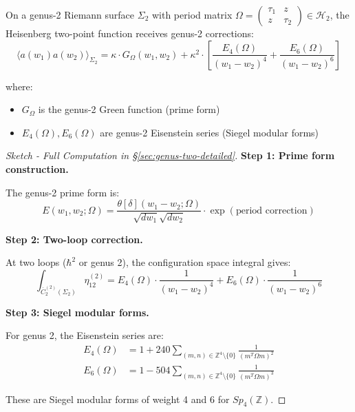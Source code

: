 \begin{theorem}\label{thm:heisenberg-genus-two}
On a genus-2 Riemann surface $\Sigma_2$ with period matrix 
$\Omega = \begin{pmatrix} \tau_1 & z \\ z & \tau_2 \end{pmatrix} \in \mathcal{H}_2$, 
the Heisenberg two-point function receives genus-2 corrections:
\begin{equation}
\langle a(w_1) a(w_2) \rangle_{\Sigma_2} = \kappa \cdot G_{\Omega}(w_1, w_2) 
+ \kappa^2 \cdot \left[\frac{E_4(\Omega)}{(w_1-w_2)^4} + \frac{E_6(\Omega)}{(w_1-w_2)^6}\right]
\end{equation}

where:
\begin{itemize}
\item $G_{\Omega}$ is the genus-2 Green function (prime form)
\item $E_4(\Omega), E_6(\Omega)$ are genus-2 Eisenstein series (Siegel modular forms)
\end{itemize}
\end{theorem}

\begin{proof}[Sketch - Full Computation in §\ref{sec:genus-two-detailed}]

\textbf{Step 1: Prime form construction.}

The genus-2 prime form is:
$$E(w_1, w_2; \Omega) = \frac{\theta[\delta](w_1 - w_2; \Omega)}
{\sqrt{dw_1}\sqrt{dw_2}} \cdot \exp(\text{period correction})$$

\textbf{Step 2: Two-loop correction.}

At two loops ($\hbar^2$ or genus 2), the configuration space integral gives:
$$\int_{\overline{C}_2^{(2)}(\Sigma_2)} \eta_{12}^{(2)} = E_4(\Omega) 
\cdot \frac{1}{(w_1-w_2)^4} + E_6(\Omega) \cdot \frac{1}{(w_1-w_2)^6}$$

\textbf{Step 3: Siegel modular forms.}

For genus 2, the Eisenstein series are:
\begin{align}
E_4(\Omega) &= 1 + 240\sum_{(m,n) \in \mathbb{Z}^4 \setminus \{0\}} 
\frac{1}{(m^T \Omega m)^2} \\
E_6(\Omega) &= 1 - 504\sum_{(m,n) \in \mathbb{Z}^4 \setminus \{0\}} 
\frac{1}{(m^T \Omega m)^3}
\end{align}

These are Siegel modular forms of weight 4 and 6 for $Sp_4(\mathbb{Z})$.
\end{proof}


